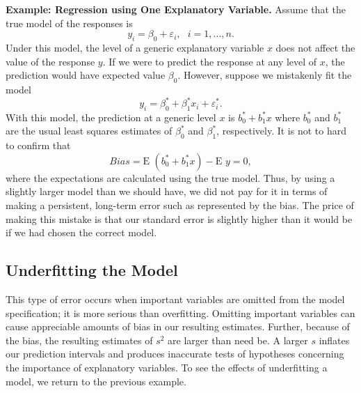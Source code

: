 \textbf{Example: Regression using One Explanatory Variable.} Assume
that the true model of the responses is
\begin{equation*}
y_i=\beta_0 + \varepsilon_i,\text{ \ \ }i=1,...,n.
\end{equation*}
Under this model, the level of a generic explanatory variable $x$
does not affect the value of the response $y$. If we were to predict
the response at any level of $x$, the prediction would have expected
value $\beta_0 $. However, suppose we mistakenly fit the model
\begin{equation*}
y_i=\beta_0 ^{\ast}+\beta_1 ^{\ast}x_i+ \varepsilon_i^{\ast}.
\end{equation*}
With this model, the prediction at a generic level $x$ is
$b_{0}^{\ast}+b_{1}^{\ast}x$ where $b_{0}^{\ast}$ and $b_{1}^{\ast}$
are the usual least squares estimates of $\beta_0 ^{\ast}$ and
$\beta_1 ^{\ast}$, respectively. It is not to hard to confirm that
\begin{equation*}
Bias=\text{E }(b_{0}^{\ast}+b_{1}^{\ast}x)-\text{E }y=0,
\end{equation*}
where the expectations are calculated using the true model. Thus, by
using a slightly larger model than we should have, we did not pay
for it in terms of making a persistent, long-term error such as
represented by the bias. The price of making this mistake is that
our standard error is slightly higher than it would be if we had
chosen the correct model.

\linejed


\subsection{Underfitting the Model}

This type of error occurs when important variables are omitted from
the model specification; it is more serious than overfitting.
Omitting important variables can cause appreciable amounts of bias
in our resulting estimates. Further, because of the bias, the
resulting estimates of $s^{2}$ are larger than need be. A larger $s$
inflates our prediction intervals and produces inaccurate tests of
hypotheses concerning the importance of explanatory variables. To
see the effects of underfitting a model, we return to the previous
example.

\linejed

